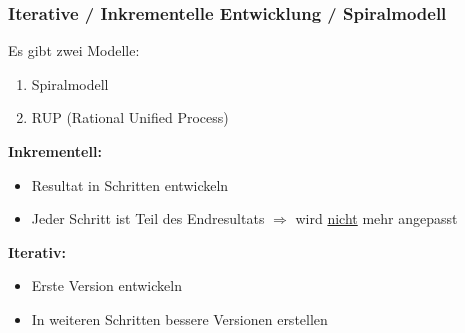 \subsubsection{Iterative / Inkrementelle Entwicklung / Spiralmodell}
Es gibt zwei Modelle:
\begin{enumerate}
    \item Spiralmodell
    \item RUP (Rational Unified Process)
\end{enumerate}
	\textbf{Inkrementell:}
		\begin{itemize}
			\item Resultat in Schritten entwickeln
			\item Jeder Schritt ist Teil des Endresultats \newline $\Rightarrow$ wird \underline{nicht} mehr angepasst
		\end{itemize}
	\textbf{Iterativ:}
		\begin{itemize}					
			\item Erste Version entwickeln
			\item In weiteren Schritten bessere Versionen erstellen
		\end{itemize}

